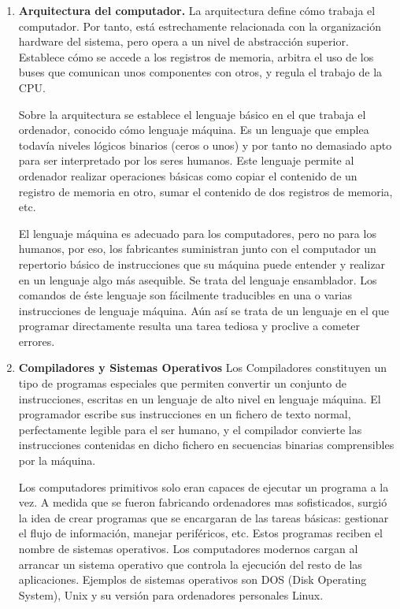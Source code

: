 \begin{paracol}{2}
\begin{enumerate}
\item \textbf{Arquitectura del computador.} 
La arquitectura define cómo trabaja el computador. Por tanto, está estrechamente relacionada con la organización hardware del sistema, pero opera a un nivel de abstracción superior. Establece cómo se accede a los registros de memoria, arbitra el uso de los buses que comunican unos componentes con otros, y regula el trabajo de la CPU.  

Sobre la arquitectura se establece el lenguaje básico en el que trabaja el ordenador, conocido cómo lenguaje máquina. Es un lenguaje que emplea todavía niveles lógicos binarios (ceros o unos) y por tanto no demasiado apto para ser interpretado por los seres humanos. Este lenguaje permite al ordenador realizar operaciones básicas como copiar el contenido de un registro de memoria en otro, sumar el contenido de dos registros de memoria, etc. 

El lenguaje máquina es adecuado para los computadores, pero no para los humanos, por eso, los fabricantes suministran junto con el computador un repertorio básico de instrucciones que su máquina puede entender y realizar en un lenguaje algo más asequible. Se trata del lenguaje ensamblador. Los comandos de éste lenguaje son fácilmente traducibles en una o varias instrucciones de lenguaje máquina.   Aún así se trata de un lenguaje en el que programar directamente resulta una tarea tediosa y proclive a cometer errores. 

\item \textbf{Compiladores y Sistemas Operativos}  
Los Compiladores constituyen un tipo de programas especiales que permiten convertir un conjunto de instrucciones, escritas en un lenguaje de alto nivel en lenguaje máquina. El programador escribe sus instrucciones en un fichero de texto normal, perfectamente legible para el ser humano, y el compilador convierte las instrucciones contenidas en dicho fichero en secuencias binarias comprensibles por la máquina.

Los computadores primitivos solo eran capaces de ejecutar un programa a la vez. A medida que se fueron fabricando ordenadores mas sofisticados, surgió la idea de crear programas que se encargaran de las tareas básicas: gestionar el flujo de información, manejar periféricos, etc. Estos programas reciben el nombre de sistemas operativos. Los computadores modernos cargan al arrancar un sistema operativo que controla la ejecución del resto de las aplicaciones. Ejemplos de sistemas operativos son DOS (Disk Operating System), Unix y su versión para ordenadores personales Linux.


\end{enumerate}
\end{paracol}
